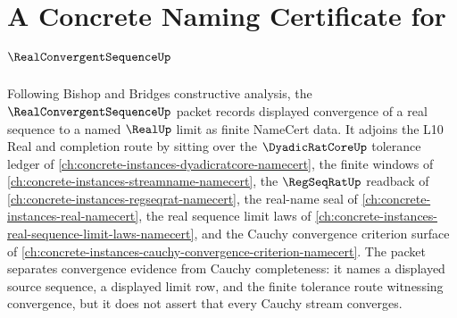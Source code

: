 \chapter{A Concrete Naming Certificate for $\RealConvergentSequenceUp$}
\label{ch:concrete-instances-real-convergent-sequence-namecert}

Following Bishop and Bridges constructive analysis, the $\RealConvergentSequenceUp$ packet records displayed convergence of a real sequence to a named $\RealUp$ limit as finite NameCert data. It adjoins the L10 Real and completion route by sitting over the $\DyadicRatCoreUp$ tolerance ledger of \autoref{ch:concrete-instances-dyadicratcore-namecert}, the finite windows of \autoref{ch:concrete-instances-streamname-namecert}, the $\RegSeqRatUp$ readback of \autoref{ch:concrete-instances-regseqrat-namecert}, the real-name seal of \autoref{ch:concrete-instances-real-namecert}, the real sequence limit laws of \autoref{ch:concrete-instances-real-sequence-limit-laws-namecert}, and the Cauchy convergence criterion surface of \autoref{ch:concrete-instances-cauchy-convergence-criterion-namecert}. The packet separates convergence evidence from Cauchy completeness: it names a displayed source sequence, a displayed limit row, and the finite tolerance route witnessing convergence, but it does not assert that every Cauchy stream converges.

